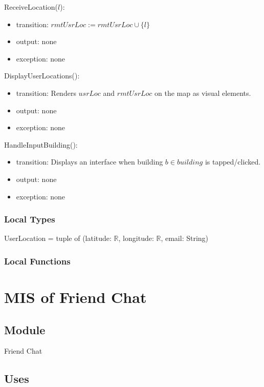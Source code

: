 \documentclass[12pt, titlepage]{article}
\begin{document}
\noindent ReceiveLocation($l$):
\begin{itemize}
\item transition: $rmtUsrLoc := rmtUsrLoc \cup \{l\}$
\item output: none
\item exception: none
\end{itemize}

\noindent DisplayUserLocations():
\begin{itemize}
\item transition: Renders $usrLoc$ and $rmtUsrLoc$ on the map as visual elements.
\item output: none
\item exception: none
\end{itemize}

\noindent HandleInputBuilding():
\begin{itemize}
\item transition: Displays an interface when building $b \in building$ is tapped/clicked.
\item output: none
\item exception: none
\end{itemize}

\subsubsection{Local Types}

UserLocation = tuple of (latitude: $\mathbb{R}$, longitude: $\mathbb{R}$, email: String)

\subsubsection{Local Functions}

\newpage

\section{MIS of Friend Chat} \label{mFC}

\subsection{Module}

Friend Chat

\subsection{Uses}
\end{document}

